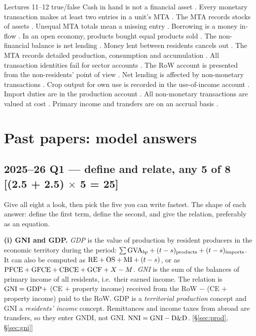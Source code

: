 \begin{quick}{Lectures 11--12 true/false}
\small Cash in hand is not a financial asset \no. Every monetary transaction makes at least two
entries in a unit's MTA \yes. The MTA records stocks of assets \no. Unequal MTA totals mean a
missing entry \yes. Borrowing is a money in-flow \yes. In an open economy, products bought equal
products sold \no. The non-financial balance is net lending \yes. Money lent between residents
cancels out \yes. The MTA records detailed production, consumption and accumulation \no. All
transaction identities fail for sector accounts \no. The RoW account is presented from the
non-residents' point of view \yes. Net lending is affected by non-monetary transactions \no. Crop
output for own use is recorded in the use-of-income account \yes. Import duties are in the
production account \yes. All non-monetary transactions are valued at cost \no. Primary income and
transfers are on an accrual basis \yes.
\end{quick}

\section{Past papers: model answers}\label{sec:pyq}

\subsection*{2025--26 Q1 --- define and relate, any 5 of 8 \hfill [(2.5 + 2.5) $\times$ 5 = 25]}
Give all eight a look, then pick the five you can write fastest. The shape of each answer:
define the first term, define the second, and give the relation, preferably as an equation.

\textbf{(i) GNI and GDP.} \emph{GDP} is the value of production by resident producers in the
economic territory during the period: $\sum\mathrm{GVA}_{bp}+(t-s)_{\text{products}}+(t-s)_{\text{imports}}$.
It can also be computed as $\mathrm{RE}+\mathrm{OS}+\mathrm{MI}+(t-s)$, or as $\mathrm{PFCE}+\mathrm{GFCE}+\mathrm{CBCE}+\mathrm{GCF}+X-M$.
\emph{GNI} is the sum of the balances of primary income of all residents, i.e.\ their earned
income. The relation is $\mathrm{GNI}=\mathrm{GDP}+$ (CE $+$ property income) received from the RoW $-$
(CE $+$ property income) paid to the RoW. GDP is a \emph{territorial production} concept and GNI
a \emph{residents' income} concept. Remittances and income taxes from abroad are transfers, so
they enter GNDI, not GNI. $\mathrm{NNI}=\mathrm{GNI}-\mathrm{D\&D}$. [\S\ref{sec:prod}, \S\ref{sec:gni}]


